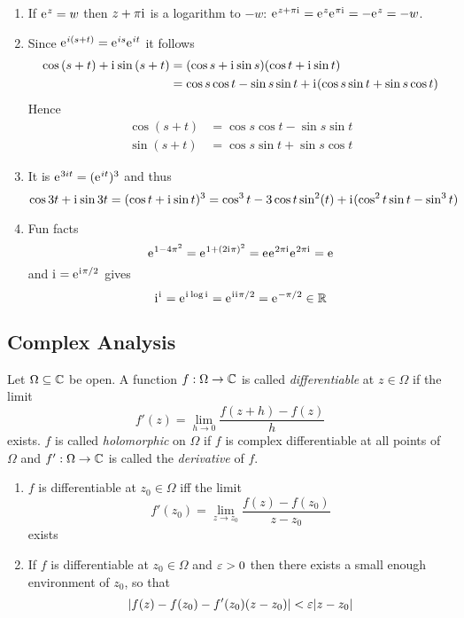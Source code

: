 \begin{exercise}\hfill
    \begin{enumerate}
        \item If \( \mathrm{e}\mkern1mu^z = w \) then \( z + \pi\mathrm{i}\mkern1mu \) is a logarithm to \( -w \):
			\( \mathrm{e}\mkern1mu^{z + \pi\mathrm{i}\mkern1mu} = \mathrm{e}\mkern1mu^{z}\mathrm{e}\mkern1mu^{\pi\mathrm{i}\mkern1mu} = - \mathrm{e}\mkern1mu^{z} = -w \).
		\item Since \( \mathrm{e}\mkern1mu^{i(s + t)} = \mathrm{e}\mkern1mu^{is} \mathrm{e}\mkern1mu^{it} \) it follows
			\[
				\begin{split}
					\cos{(s + t)} + \mathrm{i}\mkern1mu \sin{(s + t)} 
						& = (\cos{s} + \mathrm{i}\mkern1mu\sin{s})(\cos{t} + \mathrm{i}\mkern1mu\sin{t}) \\
						& = \cos{s}\cos{t} - \sin{s}\sin{t} + \mathrm{i}\mkern1mu(\cos{s}\sin{t} + \sin{s}\cos{t})
				\end{split}
			\]
			Hence
			\[
				\begin{split}
					\cos{(s + t)} & = \cos{s}\cos{t} - \sin{s}\sin{t} \\
					\sin{(s + t)} & = \cos{s}\sin{t} + \sin{s}\cos{t}
				\end{split}
			\]
		\item It is \( \mathrm{e}\mkern1mu^{3it} = (\mathrm{e}\mkern1mu^{it})^3 \) and thus
			\[
				\cos{3t} + \mathrm{i}\mkern1mu \sin{3t} 
					= (\cos{t} + \mathrm{i}\mkern1mu\sin{t})^3
					= \cos^3{t} - 3\cos{t}\sin^2(t) + \mathrm{i}\mkern1mu(\cos^2{t}\sin{t} -\sin^3{t})
			\]
        \item Fun facts
			\[ 
				\mathrm{e}\mkern1mu^{1 - 4\pi^2} = \mathrm{e}\mkern1mu^{1 + (2\mathrm{i}\mkern1mu\pi)^2} = \mathrm{e}\mkern1mu \mathrm{e}\mkern1mu^{2\pi\mathrm{i}\mkern1mu}\mathrm{e}\mkern1mu^{2\pi\mathrm{i}\mkern1mu} = \mathrm{e}\mkern1mu
			\]
			and \( \mathrm{i}\mkern1mu = \mathrm{e}\mkern1mu^{\mathrm{i}\mkern1mu\pi/2} \) gives
			\[
				\mathrm{i}\mkern1mu^\mathrm{i}\mkern1mu = \mathrm{e}\mkern1mu^{\mathrm{i}\mkern1mu\log\mathrm{i}\mkern1mu} = \mathrm{e}\mkern1mu^{\mathrm{i}\mkern1mu\mathrm{i}\mkern1mu\pi/2} = \mathrm{e}\mkern1mu^{-\pi/2} \in \mathbb{R}
			\]
    \end{enumerate}
\end{exercise}
\bigskip


\subsection{Complex Analysis}

\begin{definition}\label{def:holomorphic_fnc}
Let \( \Omega \subseteq \mathbb{C} \) be open. A function \( f : \Omega \to \mathbb{C} \) is called \emph{differentiable} at 
\( z \in \Omega \) if the limit 
\[
	f'(z) = \lim_{h \to 0} \frac{f(z + h) - f(z)}{h}
\]
exists. \( f \) is called \emph{holomorphic} on \( \Omega \) if \( f \) is complex differentiable 
at all points of \( \Omega \) and \( f': \Omega \to \mathbb{C} \) is called the \emph{derivative} of \( f \).
\end{definition}
\bigskip

\begin{remarks}\hfill
    \begin{enumerate}
        \item \( f \) is differentiable at \( z_0 \in \Omega \) iff the limit 
			\[
				f'(z_0) = \lim_{z \to z_0}  \frac{f(z) - f(z_0)}{z - z_0}  
			\]
			exists
		\item
			If \( f \) is differentiable at \( z_0 \in \Omega \) and \( \varepsilon > 0 \) then there exists a small
			enough environment of \( z_0 \), so that
			\[
				| f(z) - f(z_0) - f'(z_0)(z - z_0)| < \varepsilon |z - z_0|
			\]
    \end{enumerate}
\end{remarks}
\bigskip


